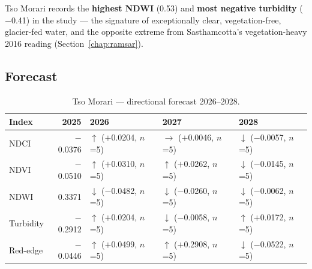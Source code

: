 \documentclass[12pt,a4paper,oneside]{report}
\begin{document}
Tso Morari records the \textbf{highest NDWI} (0.53) and \textbf{most
negative turbidity} ($-$0.41) in the study --- the signature of
exceptionally clear, vegetation-free, glacier-fed water, and the
opposite extreme from Sasthamcotta's vegetation-heavy 2016 reading
(Section~\ref{chap:ramsar}).

\subsection{Forecast}

\begin{table}[H]
\centering
\caption{Tso Morari --- directional forecast 2026--2028.}
\label{tab:tsomorari_fc}
\begin{tabular}{lrlll}
\toprule
Index & 2025 & 2026 & 2027 & 2028 \\
\midrule
NDCI & $-$0.0376 & $\uparrow$ ($+$0.0204, $n$=5) & $\rightarrow$ ($+$0.0046, $n$=5) & $\downarrow$ ($-$0.0057, $n$=5) \\
NDVI & $-$0.0510 & $\uparrow$ ($+$0.0310, $n$=5) & $\uparrow$ ($+$0.0262, $n$=5) & $\downarrow$ ($-$0.0145, $n$=5) \\
NDWI & 0.3371 & $\downarrow$ ($-$0.0482, $n$=5) & $\downarrow$ ($-$0.0260, $n$=5) & $\downarrow$ ($-$0.0062, $n$=5) \\
Turbidity & $-$0.2912 & $\uparrow$ ($+$0.0204, $n$=5) & $\downarrow$ ($-$0.0058, $n$=5) & $\uparrow$ ($+$0.0172, $n$=5) \\
Red-edge & $-$0.0446 & $\uparrow$ ($+$0.0499, $n$=5) & $\uparrow$ ($+$0.2908, $n$=5) & $\downarrow$ ($-$0.0522, $n$=5) \\
\bottomrule
\end{tabular}
\end{table}
\end{document}
